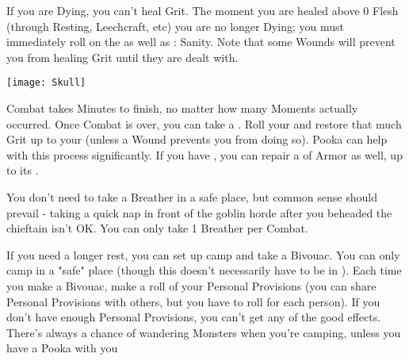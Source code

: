 {  If you are Dying, you can't heal Grit.  The moment you are healed above 0 Flesh (through Resting, Leechcraft, etc) you are no longer Dying; you must immediately roll on the  as well as \RS : Sanity.  Note that some Wounds will prevent you from healing Grit until they are dealt with.


    \begin{center}
  \texttt{[image: Skull]}
  \end{center}

  \newpage
 




  Combat takes Minutes to finish, no matter how many Moments actually occurred.  Once Combat is over, you can take a .  Roll your \FLESH and restore that much Grit up to your \MAX (unless a Wound prevents you from doing so). Pooka can help with this process significantly.  If you have , you can repair a \UD of Armor as well, up to its \MAX.

  You don't need to take a Breather in a safe place, but common sense should prevail - taking a quick nap in front of the goblin horde after you beheaded the chieftain isn't OK.  You can only take 1 Breather per Combat.



  If you need a longer rest, you can set up camp and take a Bivouac.  You can only camp in a "safe" place (though this doesn't necessarily have to be in ).  Each time you make a Bivouac, make a \UD roll of your Personal Provisions (you can share Personal Provisions with others, but you have to roll for each person).  If you don't have enough Personal Provisions, you can't get any of the good effects.  There's always a chance of wandering Monsters when you're camping, unless you have a Pooka with you




}
